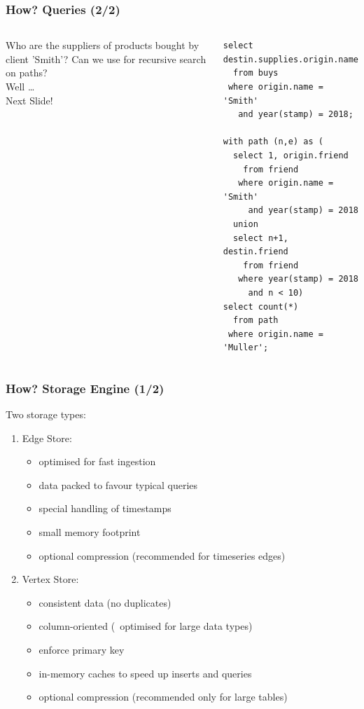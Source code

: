 \documentclass[mathserif,usenames,dvipsnames]{beamer}
\begin{document}
\begin{frame}[fragile]
\frametitle{How? Queries (2/2)}
\begin{columns}[T]
\vskip0.3cm
{\small Who are the suppliers of products bought by client 'Smith'?}
\vskip0.7cm
{\small Can we use  for recursive search on paths?}\\
{\small Well \dots}\\
{\small Next Slide!}
\begin{sqlcode}
\begin{lstlisting}
select destin.supplies.origin.name
  from buys
 where origin.name = 'Smith'
   and year(stamp) = 2018;

with path (n,e) as (
  select 1, origin.friend
    from friend
   where origin.name = 'Smith' 
     and year(stamp) = 2018
  union
  select n+1, destin.friend
    from friend
   where year(stamp) = 2018
     and n < 10)
select count(*)
  from path
 where origin.name = 'Muller';
\end{lstlisting}
\end{sqlcode}
\end{columns}
\end{frame}

\begin{frame}
\frametitle{How? Storage Engine (1/2)}
Two storage types:
\begin{enumerate}
\item Edge Store:
      \begin{itemize}
      \item optimised for fast ingestion
      \item data packed to favour typical queries
      \item special handling of timestamps
      \item small memory footprint
      \item optional compression
            (recommended for timeseries edges)
      \end{itemize}
\item Vertex Store:
      \begin{itemize}
      \item consistent data (no duplicates)
      \item column-oriented
            (\ie\ optimised for large data types)
      \item enforce primary key
      \item in-memory caches to speed up
            inserts and queries
      \item optional compression
            (recommended only for large tables)
      \end{itemize}
\end{enumerate}
\end{frame}
\end{document}
